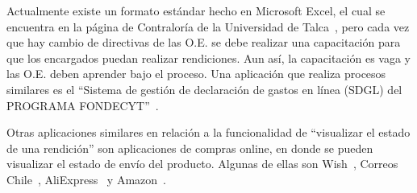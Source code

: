 Actualmente existe un formato estándar hecho en Microsoft Excel, el cual se encuentra en la página de Contraloría de la Universidad de Talca~\cite{6}, pero cada vez que hay cambio de directivas de las O.E. se debe realizar una capacitación para que los encargados puedan realizar rendiciones. Aun así, la capacitación es vaga y las O.E. deben aprender bajo el proceso.
Una aplicación que realiza procesos similares es el ``Sistema de gestión de declaración de gastos en línea (SDGL) del PROGRAMA FONDECYT''~\cite{9}.

Otras aplicaciones similares en relación a la funcionalidad de ``visualizar el estado de una rendición'' son aplicaciones de compras online, en donde se pueden visualizar el estado de envío del producto. Algunas de ellas son Wish~\cite{10}, Correos Chile~\cite{11}, AliExpress~\cite{12} y  Amazon~\cite{13}.